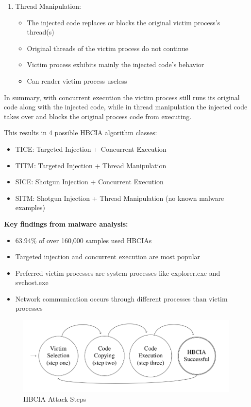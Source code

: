 \documentclass{article}
\begin{document}
\begin{itemize}
\begin{enumerate}
    \item Thread Manipulation:
        \begin{itemize}
        \item The injected code replaces or blocks the original victim process's thread(s)
        \item Original threads of the victim process do not continue
        \item Victim process exhibits mainly the injected code's behavior
        \item Can render victim process useless
      \end{itemize}
    \end{enumerate}

    In summary, with concurrent execution the victim process still runs its original code along with the injected code, while in thread manipulation the injected code takes over and blocks the original process code from executing.

\end{itemize}


This results in 4 possible HBCIA algorithm classes:

\begin{itemize}
\item TICE: Targeted Injection + Concurrent Execution 
\item TITM: Targeted Injection + Thread Manipulation
\item SICE: Shotgun Injection + Concurrent Execution
\item SITM:  Shotgun Injection + Thread Manipulation (no known malware examples)
\end{itemize}

\textbf{Key findings from malware analysis:}

\begin{itemize}
\item 63.94\% of over 160,000 samples used HBCIAs 
\item Targeted injection and concurrent execution are most popular
\item Preferred victim processes are system processes like explorer.exe and svchost.exe
\item Network communication occurs through different processes than victim processes
\end{itemize}

\begin{figure}[h]
\includegraphics[scale=0.4]{hbcia_3step_algo.png}
\caption{HBCIA Attack Steps \autocite{Barabosch:2014}}
\end{figure}
\end{document}
